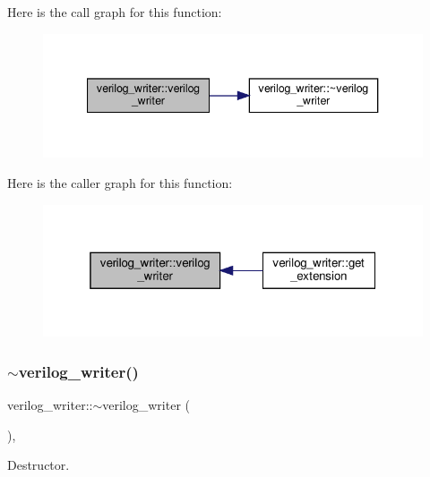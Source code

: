 Here is the call graph for this function\+:
\nopagebreak
\begin{figure}[H]
\begin{center}
\leavevmode
\includegraphics[width=340pt]{d8/dba/classverilog__writer_aa53cae880dfdd2adb20a47887f8a2a70_cgraph}
\end{center}
\end{figure}
Here is the caller graph for this function\+:
\nopagebreak
\begin{figure}[H]
\begin{center}
\leavevmode
\includegraphics[width=319pt]{d8/dba/classverilog__writer_aa53cae880dfdd2adb20a47887f8a2a70_icgraph}
\end{center}
\end{figure}
\mbox{\label{classverilog__writer_ac301c11a82d8f9e788332550df4271f7}} 
\subsubsection{\texorpdfstring{$\sim$verilog\+\_\+writer()}{~verilog\_writer()}}
{\footnotesize\ttfamily verilog\+\_\+writer\+::$\sim$verilog\+\_\+writer (\begin{DoxyParamCaption}{ }\end{DoxyParamCaption})\hspace{0.3cm}{\ttfamily [override]}, {\ttfamily [default]}}



Destructor. 



